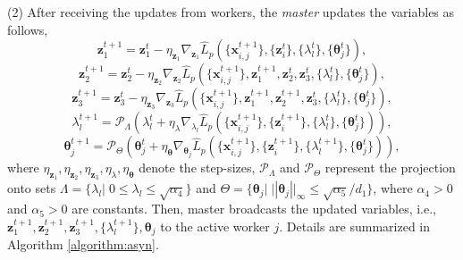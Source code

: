 \documentclass[letterpaper]{article}
\begin{document}
\noindent (2) After receiving the updates from workers, the \emph{master} updates the variables as follows,
\begin{equation}
\label{eq:update_z1_asyn}
\!{\boldsymbol{z}_1^{t+1}} \!=\! {\boldsymbol{z}_1^{t}}\!-\!\eta_{\boldsymbol{z}_1}\! \nabla_{\boldsymbol{z}_1}\widehat{L}_p(\{{\boldsymbol{x}_{i,j}^{t+1}}\} ,\!\{{\boldsymbol{z}_i^t} \},\! \{\lambda_l^t\},\! \{\boldsymbol{\theta}_j^t\} ),
\end{equation}
\begin{equation}
\label{eq:update_z2_asyn}
{\boldsymbol{z}_2^{t+1}} \!=\! {\boldsymbol{z}_2^{t}} \!-\!\eta_{\boldsymbol{z}_2}\! \nabla_{\boldsymbol{z}_2}\widehat{L}_p(\{{\boldsymbol{x}_{i,j}^{t+1}}\} ,\!{\boldsymbol{z}_1^{t+1}}\!,{\boldsymbol{z}_2^t},{\boldsymbol{z}_3^t},\! \{\lambda_l^t\},\! \{\boldsymbol{\theta}_j^t\} ),
\end{equation}
\begin{equation}
\label{eq:update_z3_asyn}
{\boldsymbol{z}_3^{t+1}} \!=\! {\boldsymbol{z}_3^{t}}\!-\!\eta_{\boldsymbol{z}_3} \! \nabla_{\boldsymbol{z}_3}\widehat{L}_p(\{{\boldsymbol{x}_{i,j}^{t+1}}\} ,\!{\boldsymbol{z}_1^{t+1}}\!,{\boldsymbol{z}_2^{t+1}}\!,{\boldsymbol{z}_3^t},\! \{\lambda_l^t\},\! \{\boldsymbol{\theta}_j^t\} ),
\end{equation}
\begin{equation}
\label{eq:update_lambda_asyn}
\!{\lambda_l^{t+1}} \!=\! \mathcal{P}_{\Lambda} ( {\lambda_l^{t}}\!+\!\eta_{\lambda}\! \nabla_{\lambda_l}\widehat{L}_p(\{{\boldsymbol{x}_{i,j}^{t+1}}\} ,\!\{{\boldsymbol{z}_i^{t+1}}\},\! \{\lambda_l^t\},\! \{\boldsymbol{\theta}_j^t\} ) ),
\end{equation}
\begin{equation}
\label{eq:update_theta_asyn}
\!{\boldsymbol{\theta}_j^{t+1}} \!=\! \mathcal{P}_{\Theta}({\boldsymbol{\theta}_j^{t}}\!+\!\eta_{\boldsymbol{\theta}}\! \nabla_{\boldsymbol{\theta}_j}\widehat{L}_p(\{{\boldsymbol{x}_{i,j}^{t+1}}\} ,\!\{{\boldsymbol{z}_i^{t+1}}\}, \!\{\lambda_l^{t+1}\}, \!\{\boldsymbol{\theta}_j^t\} )),
\end{equation}
where $\eta_{\boldsymbol{z}_1}, \eta_{\boldsymbol{z}_2}, \eta_{\boldsymbol{z}_3}, \eta_{\lambda}, \eta_{\boldsymbol{\theta}}$ denote the step-sizes, $\mathcal{P}_{\Lambda}$ and $\mathcal{P}_{\Theta}$ represent the projection onto sets ${\Lambda}=\{ \lambda_l|\; 0 \! \le \! \lambda_l \! \le \! \sqrt{\alpha_4}  \}$ and ${\Theta}=\{ \boldsymbol{\theta}_j|\; ||\boldsymbol{\theta}_j||_{\infty}\! \le \! \sqrt{\alpha_5}/d_1 \}$, where $\alpha_4 \!>\!0$ and $\alpha_5 \!>\!0$ are constants. Then, master broadcasts the updated variables, i.e., ${\boldsymbol{z}_1^{t+1}}, {\boldsymbol{z}_2^{t+1}}, {\boldsymbol{z}_3^{t+1}}, \{\lambda_l^{t+1}\}, \boldsymbol{\theta}_j$ to the active worker $j$. Details are summarized in Algorithm \ref{algorithm:asyn}.
\end{document}
